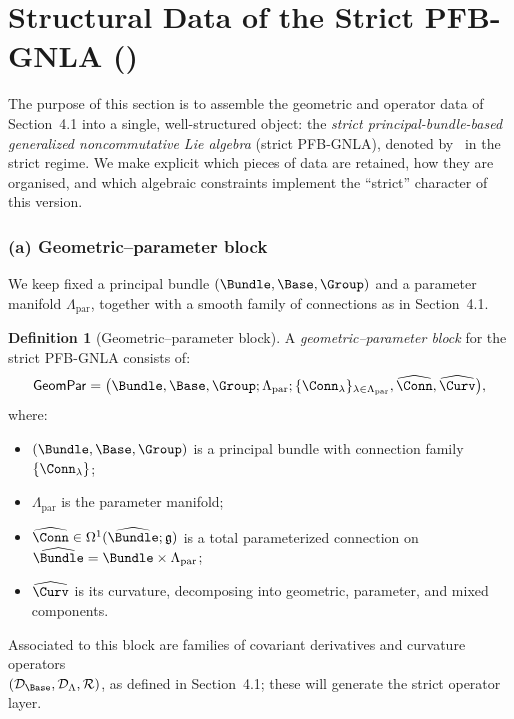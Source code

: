 \documentclass[11pt]{book}
\theoremstyle{plain}
\theoremstyle{definition}
\newtheorem{definition}[theorem]{Definition} \theoremstyle{remark}
\begin{document}
\section{Structural Data of the Strict PFB-GNLA (\GAlgebra)}


The purpose of this section is to assemble the geometric and operator
data of Section~4.1 into a single, well-structured object: the \emph{strict
principal-bundle-based generalized noncommutative Lie algebra} (strict
PFB-GNLA), denoted by \GAlgebra\ in the strict regime. We make explicit
which pieces of data are retained, how they are organised, and which
algebraic constraints implement the “strict” character of this version.



\subsubsection*{(a) Geometric–parameter block}

We keep fixed a principal bundle $(\Bundle,\Base,\Group)$ and a
parameter manifold $\Lambda_{\mathrm{par}}$, together with a smooth
family of connections as in Section~4.1.

\begin{definition}[Geometric–parameter block]
A \emph{geometric–parameter block} for the strict PFB-GNLA consists
  of:
  \[
     \mathsf{GeomPar}
     =
     \bigl(
       \Bundle,\Base,\Group;
       \Lambda_{\mathrm{par}};
       \{\Conn_\lambda\}_{\lambda\in\Lambda_{\mathrm{par}}},
       \widehat{\Conn},\widehat{\Curv}
     \bigr),
  \]
  where:
  \begin{itemize}
    \item $(\Bundle,\Base,\Group)$ is a principal bundle with
          connection family $\{\Conn_\lambda\}$;
    \item $\Lambda_{\mathrm{par}}$ is the parameter manifold;
    \item $\widehat{\Conn}\in\Omega^1(\widehat{\Bundle};\mathfrak{g})$
          is a total parameterized connection on
          $\widehat{\Bundle}=\Bundle\times\Lambda_{\mathrm{par}}$;
    \item $\widehat{\Curv}$ is its curvature, decomposing into
          geometric, parameter, and mixed components.
  \end{itemize}
\end{definition}

Associated to this block are families of covariant derivatives and curvature operators \\ 
$(\mathcal{D}_{\Base},\mathcal{D}_{\Lambda},\mathcal{R})$,
as defined in Section~4.1; these will generate the strict operator
layer.
\end{document}
